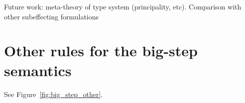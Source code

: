 \documentclass[9pt,preprint]{sigplanconf}
\begin{document}
Future work: meta-theory of type system (principality, etc). Comparison with other subeffecting formulations



\begin{small}

\end{small}

\clearpage

\appendix

\begin{figure*}[T]
\begin{small}

\end{small}

\caption{Remaining rules for the big-step semantics}
\label{fig:big_step_other}
\end{figure*}

\section{Other rules for the big-step semantics}
\label{sec:big_step_other}

See Figure~\ref{fig:big_step_other}.
\end{document}
